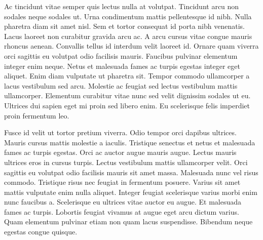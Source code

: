 \documentclass{ledger}
\begin{document}
Ac tincidunt vitae semper quis lectus nulla at volutpat. Tincidunt arcu non sodales neque sodales ut. Urna condimentum mattis pellentesque id nibh. Nulla pharetra diam sit amet nisl. Sem et tortor consequat id porta nibh venenatis. Lacus laoreet non curabitur gravida arcu ac. A arcu cursus vitae congue mauris rhoncus aenean. Convallis tellus id interdum velit laoreet id. Ornare quam viverra orci sagittis eu volutpat odio facilisis mauris. Faucibus pulvinar elementum integer enim neque. Netus et malesuada fames ac turpis egestas integer eget aliquet. Enim diam vulputate ut pharetra sit. Tempor commodo ullamcorper a lacus vestibulum sed arcu. Molestie ac feugiat sed lectus vestibulum mattis ullamcorper. Elementum curabitur vitae nunc sed velit dignissim sodales ut eu. Ultrices dui sapien eget mi proin sed libero enim. Eu scelerisque felis imperdiet proin fermentum leo.

Fusce id velit ut tortor pretium viverra. Odio tempor orci dapibus ultrices. Mauris cursus mattis molestie a iaculis. Tristique senectus et netus et malesuada fames ac turpis egestas. Orci ac auctor augue mauris augue. Lectus mauris ultrices eros in cursus turpis. Lectus vestibulum mattis ullamcorper velit. Orci sagittis eu volutpat odio facilisis mauris sit amet massa. Malesuada nunc vel risus commodo. Tristique risus nec feugiat in fermentum posuere. Varius sit amet mattis vulputate enim nulla aliquet. Integer feugiat scelerisque varius morbi enim nunc faucibus a. Scelerisque eu ultrices vitae auctor eu augue. Et malesuada fames ac turpis. Lobortis feugiat vivamus at augue eget arcu dictum varius. Quam elementum pulvinar etiam non quam lacus suspendisse. Bibendum neque egestas congue quisque.
\end{document}
